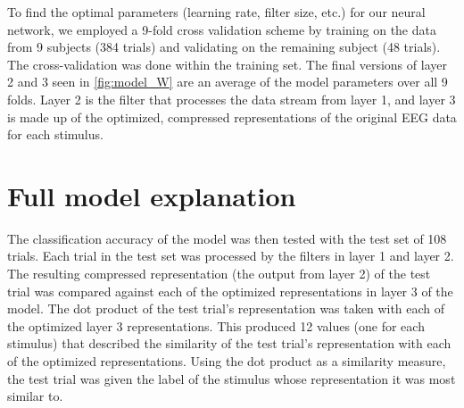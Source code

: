 To find the optimal parameters (learning rate, filter size, etc.) for our neural network, we employed a 9-fold cross validation scheme by training on the data from 9 subjects (384 trials) and validating on the remaining subject (48 trials).
The cross-validation was done within the training set. %
The final versions of layer 2 and 3 seen in \autoref{fig:model_W} are an average of the model parameters over all 9 folds.
Layer 2 is the filter that processes the data stream from layer 1, and layer 3 is made up of the optimized, compressed representations of the original EEG data for each stimulus.
\section{Full model explanation}
The classification accuracy of the model was then tested with the test set of 108 trials. 
Each trial in the test set was processed by the filters in layer 1 and layer 2. 
The resulting compressed representation (the output from layer 2) of the test trial was compared against each of the optimized representations in layer 3 of the model.
The dot product of the test trial's representation was taken with each of the optimized layer 3 representations.
This produced 12 values (one for each stimulus) that described the similarity of the test trial's representation with each of the optimized representations. 
Using the dot product as a similarity measure, the test trial was given the label of the stimulus whose representation it was most similar to. 